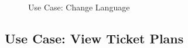 \documentclass[a4paper,12pt]{report}
\begin{document}
\begin{figure}[!htb]
	\caption{\label{fig:uc_change_language : } Use Case: Change Language}	
\end{figure} 


\vspace{0.5cm}

\subsection{Use Case: View Ticket Plans}
\end{document}
